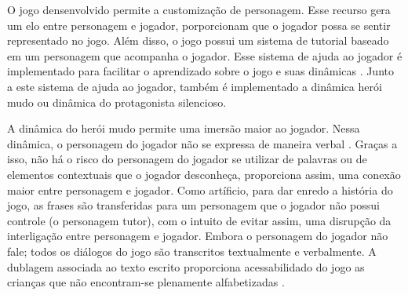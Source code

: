 \vspace{-0.1cm}

O jogo densenvolvido permite a customização de personagem. Esse recurso gera um elo entre personagem e jogador, porporcionam que o jogador possa se sentir representado no jogo. Além disso, o jogo possui um sistema de tutorial baseado em um personagem que acompanha o jogador. Esse sistema de ajuda ao jogador é implementado para facilitar o aprendizado sobre o jogo e suas dinâmicas \cite{buchinger2014sherlock}. Junto a este sistema de ajuda ao jogador, também é implementado a dinâmica herói mudo ou dinâmica do protagonista silencioso. 

\vspace{-0.1cm}

A dinâmica do herói mudo permite uma imersão maior ao jogador. Nessa dinâmica, o personagem do jogador não se expressa de maneira verbal \cite{domsch2017dialogue}. Graças a isso, não há o risco do personagem do jogador se utilizar de palavras ou de elementos contextuais que o jogador desconheça, proporciona assim, uma conexão maior entre personagem e jogador. Como artíficio, para dar enredo a história do jogo, as frases são transferidas para um personagem que o jogador não possui controle (o personagem tutor), com o intuito de evitar assim, uma disrupção da interligação entre personagem e jogador. Embora o personagem do jogador não fale; todos os diálogos do jogo são transcritos textualmente e verbalmente. A dublagem associada ao texto escrito proporciona acessabilidado do jogo as crianças que não encontram-se plenamente alfabetizadas \cite{limeira2015avaliaccao}. 

\vspace{-0.1cm}


